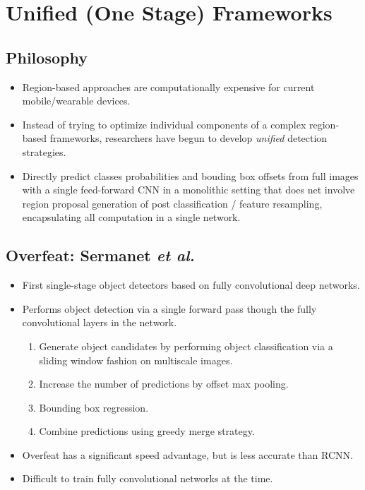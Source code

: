 \documentclass{beamer}
\begin{document}
\section{Unified (One Stage) Frameworks}


\subsection{Philosophy}
\begin{frame}{}
	\begin{itemize}
		\item Region-based approaches are computationally expensive for current mobile/wearable devices.
		\item Instead of trying to optimize individual components of a complex region-based frameworks, researchers have begun to develop \emph{unified} detection strategies.
		\item Directly predict classes probabilities and bouding box offsets from full images with a single feed-forward CNN in a monolithic setting that does net involve region proposal generation of post classification / feature resampling, encapsulating all computation in a single network.
	\end{itemize}
\end{frame}


\subsection{Overfeat: Sermanet \it{et al.} \cite{sermanet_overfeat_2013}}
\begin{frame}{}
	\begin{itemize}
		\item First single-stage object detectors based on fully convolutional deep networks.
		\item Performs object detection via a single forward pass though the fully convolutional layers in the network.
		\begin{enumerate}
			\item Generate object candidates by performing object classification via a sliding window fashion on multiscale images.
			\item Increase the number of predictions by offset max pooling.
			\item Bounding box regression.
			\item Combine predictions using greedy merge strategy.
		\end{enumerate}
		\item Overfeat has a significant speed advantage, but is less accurate than RCNN.
		\item Difficult to train fully convolutional networks at the time.
	\end{itemize}
\end{frame}
\end{document}

